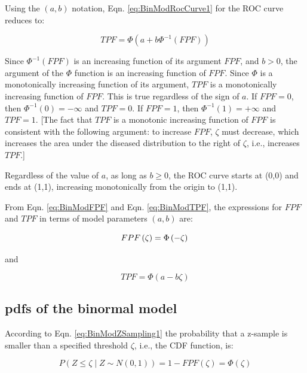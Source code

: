 \documentclass[
]{book}
\begin{document}
Using the \((a,b)\) notation, Eqn. \eqref{eq:BinModRocCurve1} for the ROC curve reduces to:

\begin{equation} 
TPF = \Phi\left ( a+ b \Phi^{-1}\left (FPF  \right ) \right )
\label{eq:BinModRocCurve}
\end{equation}

Since \(\Phi^{-1}(FPF)\) is an increasing function of its argument \(FPF\), and \(b > 0\), the argument of the \(\Phi\) function is an increasing function of \(FPF\). Since \(\Phi\) is a monotonically increasing function of its argument, \(TPF\) is a monotonically increasing function of \(FPF\). This is true regardless of the sign of \(a\). If \(FPF = 0\), then \(\Phi^{-1}(0) = -\infty\) and \(TPF = 0\). If \(FPF = 1\), then \(\Phi^{-1}(1) = +\infty\) and \(TPF = 1\). {[}The fact that \(TPF\) is a monotonic increasing function of \(FPF\) is consistent with the following argument: to increase \(FPF\), \(\zeta\) must decrease, which increases the area under the diseased distribution to the right of \(\zeta\), i.e., increases \(TPF\).{]}

Regardless of the value of \(a\), as long as \(b \ge 0\), the ROC curve starts at (0,0) and ends at (1,1), increasing monotonically from the origin to (1,1).

From Eqn. \eqref{eq:BinModFPF} and Eqn. \eqref{eq:BinModTPF}, the expressions for \(FPF\) and \(TPF\) in terms of model parameters \((a,b)\) are:

\begin{equation} 
FPF\left ( \zeta \right ) = \Phi\left ( -\zeta \right )\\
\label{eq:BinModFPFab}
\end{equation}

and

\begin{equation} 
TPF = \Phi\left ( a - b \zeta \right )
\label{eq:BinModTPFab}
\end{equation}

\hypertarget{pdfs-of-the-binormal-model}{%
\subsection{pdfs of the binormal model}\label{pdfs-of-the-binormal-model}}

According to Eqn. \eqref{eq:BinModZSampling1} the probability that a z-sample is smaller than a specified threshold \(\zeta\), i.e., the CDF function, is:

\begin{equation*} 
P\left ( Z \le \zeta \mid  Z\sim N\left ( 0,1 \right ) \right ) = 1-FPF\left ( \zeta \right ) = \Phi \left ( \zeta  \right )
\end{equation*}
\end{document}
